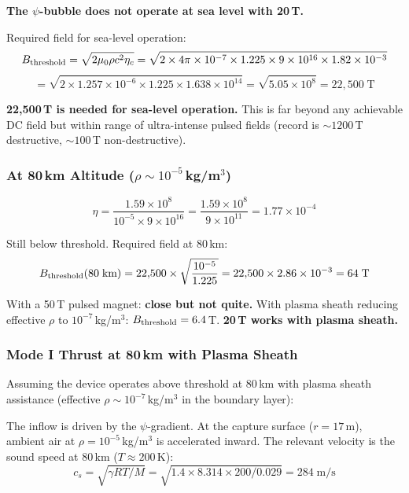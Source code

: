 \documentclass[12pt,letterpaper]{article}
\begin{document}
\textbf{The $\psi$-bubble does not operate at sea level with 20\,T.}

Required field for sea-level operation:
\begin{equation}
B_{\rm threshold} = \sqrt{2\mu_0 \rho c^2 \eta_c} = \sqrt{2 \times 4\pi \times 10^{-7} \times 1.225 \times 9 \times 10^{16} \times 1.82 \times 10^{-3}}
\end{equation}
\begin{equation}
= \sqrt{2 \times 1.257 \times 10^{-6} \times 1.225 \times 1.638 \times 10^{14}} = \sqrt{5.05 \times 10^{8}} = 22{,}500\;\text{T}
\end{equation}

\textbf{22,500\,T is needed for sea-level operation.} This is far beyond any
achievable DC field but within range of ultra-intense pulsed fields (record
is $\sim 1200$\,T destructive, $\sim 100$\,T non-destructive).

\subsubsection{At 80\,km Altitude ($\rho \sim 10^{-5}$\,kg/m$^3$)}

\begin{equation}
\eta = \frac{1.59 \times 10^8}{10^{-5} \times 9 \times 10^{16}} = \frac{1.59 \times 10^8}{9 \times 10^{11}} = 1.77 \times 10^{-4}
\end{equation}

Still below threshold. Required field at 80\,km:
\begin{equation}
B_{\rm threshold}(80\;\text{km}) = 22{,}500 \times \sqrt{\frac{10^{-5}}{1.225}} = 22{,}500 \times 2.86 \times 10^{-3} = 64\;\text{T}
\end{equation}

With a 50\,T pulsed magnet: \textbf{close but not quite.} With plasma sheath
reducing effective $\rho$ to $10^{-7}$\,kg/m$^3$: $B_{\rm threshold} = 6.4$\,T.
\textbf{20\,T works with plasma sheath.}

\subsubsection{Mode I Thrust at 80\,km with Plasma Sheath}

Assuming the device operates above threshold at 80\,km with plasma sheath
assistance (effective $\rho \sim 10^{-7}$\,kg/m$^3$ in the boundary layer):

The inflow is driven by the $\psi$-gradient. At the capture surface
($r = 17$\,m), ambient air at $\rho = 10^{-5}$\,kg/m$^3$ is accelerated inward.
The relevant velocity is the sound speed at 80\,km ($T \approx 200$\,K):
\begin{equation}
c_s = \sqrt{\gamma R T / M} = \sqrt{1.4 \times 8.314 \times 200 / 0.029} = 284\;\text{m/s}
\end{equation}
\end{document}
